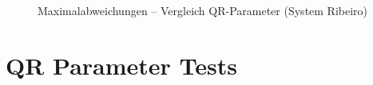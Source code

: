 \begin{figure}
	\caption{Maximalabweichungen -- Vergleich QR-Parameter (System Ribeiro)}
	\label{fig:qrvglrib}
\end{figure}




\section{QR Parameter Tests}\label{sec:x0qr}





